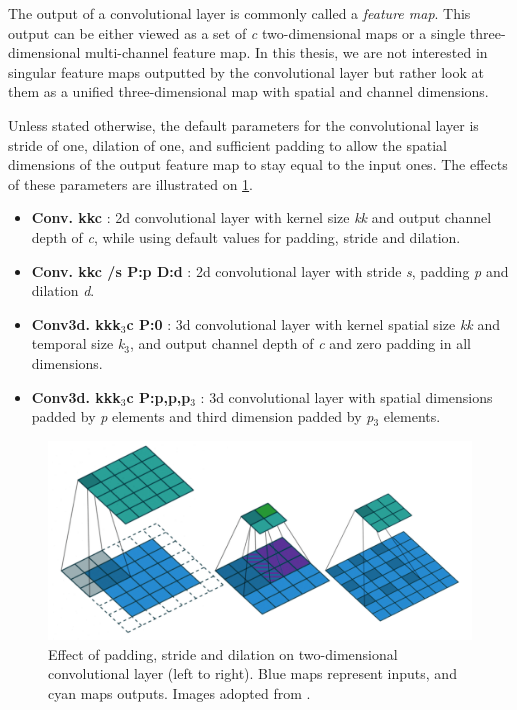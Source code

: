 The output of a convolutional layer is commonly called a \textit{feature map}. This output can be either viewed as a set of \textit{c} two-dimensional maps or a single three-dimensional multi-channel feature map. In this thesis, we are not interested in singular feature maps outputted by the convolutional layer but rather look at them as a unified three-dimensional map with spatial and channel dimensions.

Unless stated otherwise, the default parameters for the convolutional layer is stride of one, dilation of one, and sufficient padding to allow the spatial dimensions of the output feature map to stay equal to the input ones. The effects of these parameters are illustrated on \cref{fig:convolutions}.

\begin{itemize}
    \item \textbf{Conv. k\x k\x c} : 2d convolutional layer with kernel size \textit{k\x k} and output channel depth of \textit{c}, while using default values for padding, stride and dilation.
    
    \item \textbf{Conv. k\x k\x c /s P:p D:d} : 2d convolutional layer with stride \textit{s}, padding \textit{p} and dilation \textit{d}. 
    
    \item \textbf{Conv3d. k\x k\x k$_3$\x c P:0} : 3d convolutional layer with kernel spatial size \textit{k\x k} and temporal size \textit{k$_3$}, and output channel depth of \textit{c} and zero padding in all dimensions. 
    
    \item \textbf{Conv3d. k\x k\x k$_3$\x c P:p,p,p$_3$} : 3d convolutional layer with spatial dimensions padded by \textit{p} elements and third dimension padded by \textit{p$_3$} elements.
\end{itemize}

\begin{figure}
    \centering
    \includegraphics[width=\textwidth]{img/convolutions}
    \caption[Parametrization of convolutional layer]{Effect of padding, stride and dilation on two-dimensional convolutional layer (left to right). Blue maps represent inputs, and cyan maps outputs. Images adopted from \citet{bib:convolution}.}
    \label{fig:convolutions}
\end{figure}

